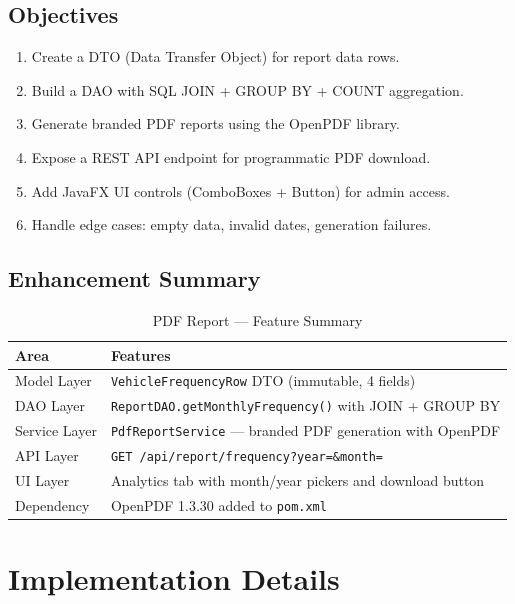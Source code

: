 \documentclass[12pt,a4paper]{article}
\begin{document}
\subsection{Objectives}
\begin{enumerate}[noitemsep]
    \item Create a DTO (Data Transfer Object) for report data rows.
    \item Build a DAO with SQL JOIN + GROUP BY + COUNT aggregation.
    \item Generate branded PDF reports using the OpenPDF library.
    \item Expose a REST API endpoint for programmatic PDF download.
    \item Add JavaFX UI controls (ComboBoxes + Button) for admin access.
    \item Handle edge cases: empty data, invalid dates, generation failures.
\end{enumerate}

\subsection{Enhancement Summary}

\begin{table}[H]
\centering
\caption{PDF Report — Feature Summary}
\begin{tabularx}{\textwidth}{|l|X|}
\hline
\textbf{Area} & \textbf{Features} \\
\hline
Model Layer & \texttt{VehicleFrequencyRow} DTO (immutable, 4 fields) \\
\hline
DAO Layer & \texttt{ReportDAO.getMonthlyFrequency()} with JOIN + GROUP BY \\
\hline
Service Layer & \texttt{PdfReportService} — branded PDF generation with OpenPDF \\
\hline
API Layer & \texttt{GET /api/report/frequency?year=\&month=} \\
\hline
UI Layer & Analytics tab with month/year pickers and download button \\
\hline
Dependency & OpenPDF 1.3.30 added to \texttt{pom.xml} \\
\hline
\end{tabularx}
\end{table}

\section{Implementation Details}
\end{document}
